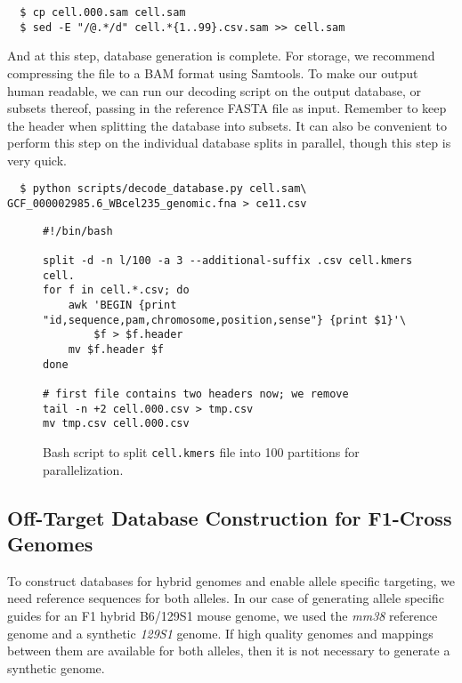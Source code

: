 \documentclass[10pt]{article}
\begin{document}
\begin{verbatim}
  $ cp cell.000.sam cell.sam
  $ sed -E "/@.*/d" cell.*{1..99}.csv.sam >> cell.sam
\end{verbatim}

And at this step, database generation is complete. For storage, we
recommend compressing the file to a BAM format using Samtools. To make
our output human readable, we can run our decoding script on the
output database, or subsets thereof, passing in the reference FASTA
file as input. Remember to keep the header when splitting the database
into subsets. It can also be convenient to perform this step on the
individual database splits in parallel, though this step is very
quick.

\vspace{-0.8em}
\begin{verbatim}
  $ python scripts/decode_database.py cell.sam\ GCF_000002985.6_WBcel235_genomic.fna > ce11.csv
\end{verbatim}

\begin{figure}[ht]
  \centering
\begin{verbatim}
#!/bin/bash

split -d -n l/100 -a 3 --additional-suffix .csv cell.kmers cell.
for f in cell.*.csv; do
    awk 'BEGIN {print "id,sequence,pam,chromosome,position,sense"} {print $1}'\
        $f > $f.header
    mv $f.header $f
done

# first file contains two headers now; we remove
tail -n +2 cell.000.csv > tmp.csv
mv tmp.csv cell.000.csv
\end{verbatim}
\caption{\label{fig:splitkmers} Bash script to split
  \texttt{cell.kmers} file into 100 partitions for parallelization.}
\end{figure}

\subsection{Off-Target Database Construction for F1-Cross Genomes}

To construct databases for hybrid genomes and enable allele specific
targeting, we need reference sequences for both alleles.  In our case
of generating allele specific guides for an F1 hybrid B6/129S1 mouse
genome, we used the \textit{mm38} reference genome and a synthetic
\textit{129S1} genome. If high quality genomes and mappings between them are
available for both alleles, then it is not necessary to generate a
synthetic genome.
\end{document}
